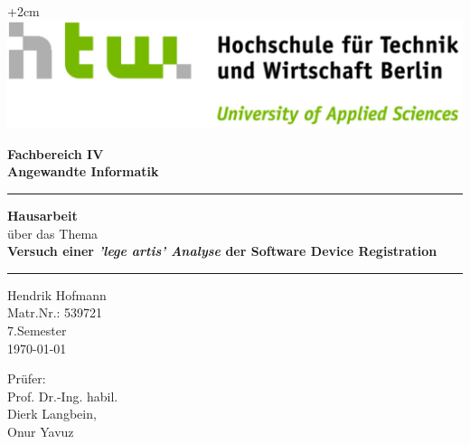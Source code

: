 \documentclass[11pt,a4paper,bibliography=totocnumbered,listof=totocnumbered]{scrartcl}
\begin{document}
\begin{center}
		\vspace*{.2cm}
		\begin{flushright}
			\advance\rightskip+2cm
			\includegraphics[width=.4\textwidth]{img/HTW-quer-rgb.pdf} %
		\end{flushright}
	\vspace*{3cm}
	\Large
	\textbf{Fachbereich IV}\\
	\textbf{Angewandte Informatik}\\
	\vspace*{2cm}
	{\rule{\linewidth}{0.5mm}}
	\Huge
	\textbf{Hausarbeit}\\
	\vspace*{0.5cm}
	\large
	über das Thema\\
	\vspace*{1cm}
	\textbf{Versuch einer \textit{'lege artis' Analyse} der Software Device Registration}\\
	{\rule{\linewidth}{0.5mm}}
	\vspace*{2cm}
	
	\vfill
	\normalsize
		\begin{minipage}[t]{0.4\textwidth}
			\begin{flushleft} %
				
				Hendrik Hofmann\\ Matr.Nr.: 539721 \\7.Semester \\{\today}
				
			\end{flushleft}
		\end{minipage}
		\begin{minipage}[t]{0.3\textwidth}
			\begin{flushright} %
				  Prüfer: \\Prof. Dr.-Ing. habil. \\Dierk Langbein, \\ Onur Yavuz
			\end{flushright}
		\end{minipage}
\end{center}
\pagebreak



\renewcommand{\cfttabpresnum}{Tab. }
\renewcommand{\cftfigpresnum}{Abb. }
\settowidth{\cfttabnumwidth}{Abb. 10\quad}
\settowidth{\cftfignumwidth}{Abb. 10\quad}
\end{document}
